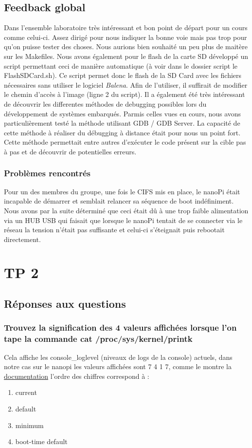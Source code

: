 \documentclass{ReportTemplate}
\begin{document}
\section{Feedback global}
Dans l'ensemble laboratoire très intéressant et bon point de départ pour un
cours comme celui-ci. Assez dirigé pour nous indiquer la bonne voie mais pas
trop pour qu'on puisse tester des choses. Nous aurions bien souhaité un peu plus
de maitère sur les Makefiles.\newline
Nous avons également pour le flash de la carte SD développé un script permettant
ceci de manière automatique (à voir dans le dossier script le FlashSDCard.sh).
Ce script permet donc le flash de la SD Card avec les fichiers nécessaires sans
utiliser le logiciel \textit{Balena}. Afin de l'utiliser, il suffirait de
modifier le chemin d'accès à l'image (ligne 2 du script). Il a également été
très intéressant de découvrir les differentes méthodes de debugging possibles
lors du développement de systèmes embarqués. Parmis celles vues en cours, nous
avons particulièrement testé la méthode utilisant GDB / GDB Server. La capacité
de cette méthode à réaliser du débugging à distance était pour nous un point
fort. Cette méthode permettait entre autres d'exécuter le code présent sur la
cible pas à pas et de découvrir de potentielles erreurs.\newline
\subsection{Problèmes rencontrés}
Pour un des membres du groupe, une fois le CIFS mis en place, le nanoPi était
incapable de démarrer et semblait relancer sa séquence de boot indéfiniment.
Nous avons par la suite déterminé que ceci était dû à une trop faible
alimentation via un HUB USB qui faisait que lorsque le nanoPi tentait de se
connecter via le réseau la tension n'était pas suffisante et celui-ci
s'éteignait puis rebootait directement.

\chapter{TP 2}
\section{Réponses aux questions}
\subsection{Trouvez la signification des 4 valeurs affichées lorsque l’on tape la commande cat /proc/sys/kernel/printk}
Cela affiche les console\_loglevel (niveaux de logs de la console) actuels, dans
notre cas sur le nanopi les valeurs affichées sont 7 4 1 7, comme le montre la
\href{https://www.kernel.org/doc/html/latest/core-api/printk-basics.html}{documentation}
l'ordre des chiffres correspond à :
\begin{enumerate}
    \item current
    \item default
    \item minimum
    \item boot-time default
\end{enumerate}
\end{document}
